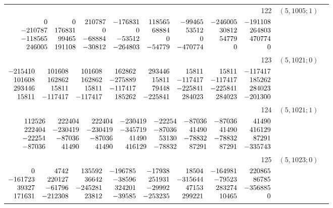 \documentclass[11pt]{article}
\theoremstyle{remark}
\numberwithin{equation}{section}
\begin{document}
\begin{longtable}{rcl}
122 & $(5,1005;1)$ & \begin{tabular}[t]{@{}l@{}}$w_i=\displaystyle \frac{12321983632492903}{6399223084829465625000000000000000}$\\[3pt]{\scriptsize$\begin{array}{@{}rrrrrrrr@{}}0 & 0 & 210787 & -176831 & 118565 & -99465 & -246005 & -191108\\-210787 & 176831 & 0 & 0 & 68884 & 53512 & 30812 & 264803\\-118565 & 99465 & -68884 & -53512 & 0 & 0 & 54779 & 470774\\246005 & 191108 & -30812 & -264803 & -54779 & -470774 & 0 & 0\end{array}$}\end{tabular}\\[8pt]
123 & $(5,1021;0)$ & \begin{tabular}[t]{@{}l@{}}$w_i=\displaystyle \frac{51851331871681}{958794388997250000000000000000000}$\\[3pt]{\scriptsize$\begin{array}{@{}rrrrrrrr@{}}-215410 & 101608 & 101608 & 162862 & 293446 & 15811 & 15811 & -117417\\101608 & 162862 & 162862 & -275889 & 15811 & -117417 & -117417 & 185262\\293446 & 15811 & 15811 & -117417 & 79448 & -225841 & -225841 & 284023\\15811 & -117417 & -117417 & 185262 & -225841 & 284023 & 284023 & -201300\end{array}$}\end{tabular}\\[8pt]
124 & $(5,1021;1)$ & \begin{tabular}[t]{@{}l@{}}$w_i=\displaystyle \frac{176763181912949}{145370429806927500000000000000000}$\\[3pt]{\scriptsize$\begin{array}{@{}rrrrrrrr@{}}112526 & 222404 & 222404 & -230419 & -22254 & -87036 & -87036 & 41490\\222404 & -230419 & -230419 & -345719 & -87036 & 41490 & 41490 & 416129\\-22254 & -87036 & -87036 & 41490 & 53130 & -78832 & -78832 & 87291\\-87036 & 41490 & 41490 & 416129 & -78832 & 87291 & 87291 & -335743\end{array}$}\end{tabular}\\[8pt]
125 & $(5,1023;0)$ & \begin{tabular}[t]{@{}l@{}}$w_i=\displaystyle \frac{1463593012977857}{2875861001477625000000000000000000}$\\[3pt]{\scriptsize$\begin{array}{@{}rrrrrrrr@{}}0 & 4742 & 135592 & -196785 & -17938 & 18504 & -164981 & 220865\\-161723 & 220127 & 36642 & -38596 & 251931 & -315644 & -79523 & 86785\\39327 & -61796 & -245281 & 324201 & -29992 & 47153 & 283274 & -356885\\171631 & -212308 & 23812 & -39585 & -253235 & 299221 & 10465 & 0\end{array}$}\end{tabular}\\[8pt]

\end{longtable}
\end{document}
